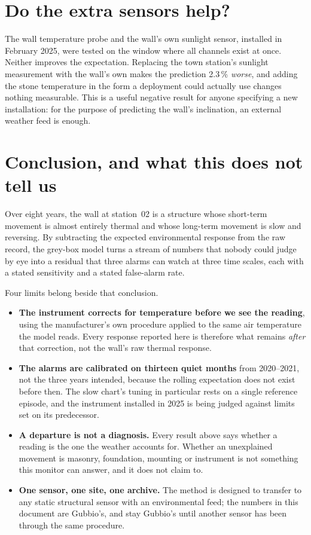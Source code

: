 \documentclass[11pt,a4paper]{article}
\begin{document}
\section{Do the extra sensors help?}
\label{sec:extra}

The wall temperature probe and the wall's own sunlight sensor, installed in
February 2025, were tested on the window where all channels exist at once. Neither
improves the expectation. Replacing the town station's sunlight measurement with
the wall's own makes the prediction 2.3\,\% \emph{worse}, and adding the stone
temperature in the form a deployment could actually use changes nothing
measurable. This is a useful negative result for anyone specifying a new
installation: for the purpose of predicting the wall's inclination, an external
weather feed is enough.

\section{Conclusion, and what this does not tell us}

Over eight years, the wall at station~02 is a structure whose short-term movement
is almost entirely thermal and whose long-term movement is slow and reversing. By
subtracting the expected environmental response from the raw record, the grey-box
model turns a stream of numbers that nobody could judge by eye into a residual
that three alarms can watch at three time scales, each with a stated sensitivity
and a stated false-alarm rate.

Four limits belong beside that conclusion.

\begin{itemize}
    \item \textbf{The instrument corrects for temperature before we see the
    reading}, using the manufacturer's own procedure applied to the same air
    temperature the model reads. Every response reported here is therefore what
    remains \emph{after} that correction, not the wall's raw thermal response.
    \item \textbf{The alarms are calibrated on thirteen quiet months} from
    2020--2021, not the three years intended, because the rolling expectation
    does not exist before then. The slow chart's tuning in particular rests on a
    single reference episode, and the instrument installed in 2025 is being judged
    against limits set on its predecessor.
    \item \textbf{A departure is not a diagnosis.} Every result above says whether
    a reading is the one the weather accounts for. Whether an unexplained movement
    is masonry, foundation, mounting or instrument is not something this monitor
    can answer, and it does not claim to.
    \item \textbf{One sensor, one site, one archive.} The method is designed to
    transfer to any static structural sensor with an environmental feed; the
    numbers in this document are Gubbio's, and stay Gubbio's until another sensor
    has been through the same procedure.
\end{itemize}
\end{document}
